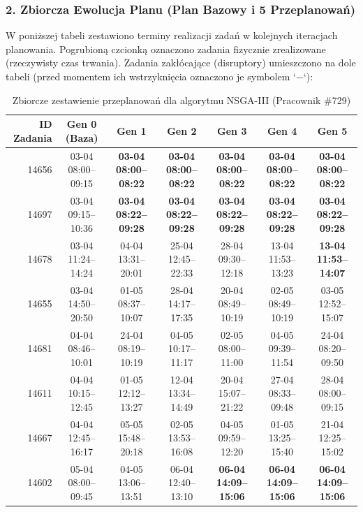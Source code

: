 \subsubsection*{2. Zbiorcza Ewolucja Planu (Plan Bazowy i 5 Przeplanowań)}

W poniższej tabeli zestawiono terminy realizacji zadań w kolejnych iteracjach planowania. Pogrubioną czcionką oznaczono zadania fizycznie zrealizowane (rzeczywisty czas trwania). Zadania zakłócające (disruptory) umieszczono na dole tabeli (przed momentem ich wstrzyknięcia oznaczono je symbolem `$-$`):

\begin{table}[htbp]
\centering\scriptsize
\caption{Zbiorcze zestawienie przeplanowań dla algorytmu NSGA-III (Pracownik \#729)}
\label{tab:case_study_evolution_nsgaiii_u729}
\begin{tabular}{|r|c|c|c|c|c|c|}
\hline
\textbf{ID Zadania} & \textbf{Gen 0 (Baza)} & \textbf{Gen 1} & \textbf{Gen 2} & \textbf{Gen 3} & \textbf{Gen 4} & \textbf{Gen 5} \\ \hline
14656 & 03-04 08:00--09:15 & \textbf{03-04 08:00--08:22} & \textbf{03-04 08:00--08:22} & \textbf{03-04 08:00--08:22} & \textbf{03-04 08:00--08:22} & \textbf{03-04 08:00--08:22} \\ 
14697 & 03-04 09:15--10:36 & \textbf{03-04 08:22--09:28} & \textbf{03-04 08:22--09:28} & \textbf{03-04 08:22--09:28} & \textbf{03-04 08:22--09:28} & \textbf{03-04 08:22--09:28} \\ 
14678 & 03-04 11:24--14:24 & 04-04 13:31--20:01 & 25-04 12:45--22:33 & 28-04 09:30--12:18 & 13-04 11:53--13:23 & \textbf{13-04 11:53--14:07} \\ 
14655 & 03-04 14:50--20:50 & 01-05 08:37--10:07 & 28-04 14:17--17:35 & 20-04 08:49--10:19 & 02-05 08:49--10:19 & 03-05 12:52--15:07 \\ 
14681 & 04-04 08:46--10:01 & 24-04 08:19--10:19 & 04-05 10:17--11:17 & 02-05 08:00--11:00 & 04-05 09:39--11:54 & 24-04 08:20--09:50 \\ 
14611 & 04-04 10:15--12:45 & 01-05 12:12--13:27 & 12-04 13:34--14:49 & 20-04 15:07--21:22 & 27-04 08:33--09:48 & 28-04 08:00--09:15 \\ 
14667 & 04-04 12:45--16:17 & 05-05 15:48--20:18 & 02-05 13:53--16:08 & 04-05 09:59--12:20 & 01-05 13:25--15:40 & 21-04 12:25--15:02 \\ 
14602 & 05-04 08:00--09:45 & 04-05 13:06--13:51 & 06-04 12:40--13:10 & \textbf{06-04 14:09--15:06} & \textbf{06-04 14:09--15:06} & \textbf{06-04 14:09--15:06} \\ 

\end{tabular}
\end{table}
